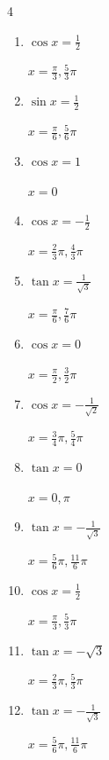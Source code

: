 \begin{multicols}{4}
\begin{enumerate}
  \item $\displaystyle \cos{x}  = \frac{1}{2}$

        $\displaystyle x = \frac{\pi}{3} , \frac{5}{3}\pi$

  \item $\displaystyle \sin{x}  = \frac{1}{2}$

        $\displaystyle x = \frac{\pi}{6} , \frac{5}{6}\pi$

  \item $\displaystyle \cos{x}  = 1$

        $\displaystyle x = 0$

  \item $\displaystyle \cos{x}  = -\frac{1}{2}$

        $\displaystyle x = \frac{2}{3}\pi , \frac{4}{3}\pi$

  \item $\displaystyle \tan{x}  = \frac{1}{\sqrt{3}}$

        $\displaystyle x = \frac{\pi}{6} , \frac{7}{6}\pi$

  \item $\displaystyle \cos{x}  = 0$

        $\displaystyle x = \frac{\pi}{2} , \frac{3}{2}\pi$

  \item $\displaystyle \cos{x}  = -\frac{1}{\sqrt{2}}$

        $\displaystyle x = \frac{3}{4}\pi , \frac{5}{4}\pi$

  \item $\displaystyle \tan{x}  = 0$

        $\displaystyle x = 0 , \pi$

  \item $\displaystyle \tan{x}  = -\frac{1}{\sqrt{3}}$

        $\displaystyle x = \frac{5}{6}\pi , \frac{11}{6}\pi$

  \item $\displaystyle \cos{x}  = \frac{1}{2}$

        $\displaystyle x = \frac{\pi}{3} , \frac{5}{3}\pi$

  \item $\displaystyle \tan{x}  = -\sqrt{3}$

        $\displaystyle x = \frac{2}{3}\pi , \frac{5}{3}\pi$

  \item $\displaystyle \tan{x}  = -\frac{1}{\sqrt{3}}$

        $\displaystyle x = \frac{5}{6}\pi , \frac{11}{6}\pi$


\end{enumerate}
\end{multicols}
